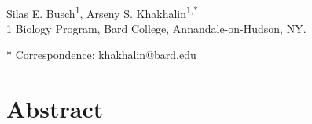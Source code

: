 \documentclass{article}
\providecommand{\DIFaddbegin}{} %
\providecommand{\DIFaddend}{} %
\newcommand{\DIFaddincludegraphics}[2][]{{\color{blue}\fbox{\DIFOincludegraphics[#1]{#2}}}} %
\DeclareRobustCommand{\DIFaddbegin}{\DIFOaddbegin \let\includegraphics\DIFaddincludegraphics} %
\DeclareRobustCommand{\DIFaddend}{\DIFOaddend \let\includegraphics\DIFOincludegraphics} %
\begin{document}


\DIFaddbegin \linenumbers %
\DIFaddend 

\begin{flushleft}
{\Large
\textbf{}
}
\newline
\\
Silas E. Busch\textsuperscript{1},
Arseny S. Khakhalin\textsuperscript{1,*}
\\
\bigskip
{1} Biology Program, Bard College, Annandale-on-Hudson, NY. 

* Correspondence: khakhalin@bard.edu

\section*{Abstract}


\end{flushleft}
\end{document}
